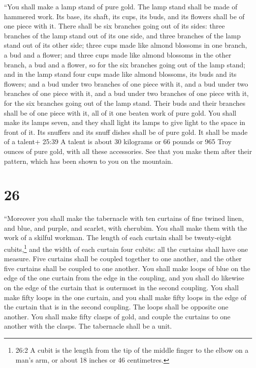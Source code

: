  ``You shall make a lamp stand of pure gold. The lamp stand
shall be made of hammered work. Its base, its shaft, its cups, its buds,
and its flowers shall be of one piece with it.  There shall
be six branches going out of its sides: three branches of the lamp stand
out of its one side, and three branches of the lamp stand out of its
other side;  three cups made like almond blossoms in one
branch, a bud and a flower; and three cups made like almond blossoms in
the other branch, a bud and a flower, so for the six branches going out
of the lamp stand;  and in the lamp stand four cups made
like almond blossoms, its buds and its flowers;  and a bud
under two branches of one piece with it, and a bud under two branches of
one piece with it, and a bud under two branches of one piece with it,
for the six branches going out of the lamp stand.  Their
buds and their branches shall be of one piece with it, all of it one
beaten work of pure gold.  You shall make its lamps seven,
and they shall light its lamps to give light to the space in front of
it.  Its snuffers and its snuff dishes shall be of pure
gold.  It shall be made of a talent+ 25:39 A talent is
about 30 kilograms or 66 pounds or 965 Troy ounces of pure gold, with
all these accessories.  See that you make them after their
pattern, which has been shown to you on the mountain.

\hypertarget{section-25}{%
\section{26}\label{section-25}}

 ``Moreover you shall make the tabernacle with ten curtains
of fine twined linen, and blue, and purple, and scarlet, with cherubim.
You shall make them with the work of a skilful workman.  The
length of each curtain shall be twenty-eight cubits,\footnote{26:2 A
  cubit is the length from the tip of the middle finger to the elbow on
  a man's arm, or about 18 inches or 46 centimetres.} and the width of
each curtain four cubits: all the curtains shall have one measure.
 Five curtains shall be coupled together to one another, and
the other five curtains shall be coupled to one another. 
You shall make loops of blue on the edge of the one curtain from the
edge in the coupling, and you shall do likewise on the edge of the
curtain that is outermost in the second coupling.  You shall
make fifty loops in the one curtain, and you shall make fifty loops in
the edge of the curtain that is in the second coupling. The loops shall
be opposite one another.  You shall make fifty clasps of
gold, and couple the curtains to one another with the clasps. The
tabernacle shall be a unit.

